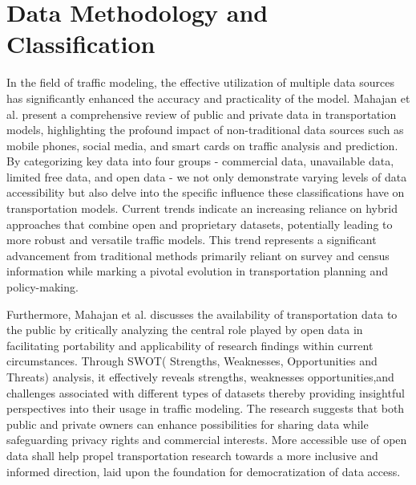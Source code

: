 \documentclass[12pt,two side]{report}
\begin{document}
\section {Data Methodology and Classification}
In the field of traffic modeling, the effective utilization of multiple data sources has significantly enhanced the accuracy and practicality of the model. Mahajan et al. present a comprehensive review of public and private data in transportation models, highlighting the profound impact of non-traditional data sources such as mobile phones, social media, and smart cards on traffic analysis and prediction\cite{mahajan2022data}. By categorizing key data into four groups - commercial data, unavailable data, limited free data, and open data - we not only demonstrate varying levels of data accessibility but also delve into the specific influence these classifications have on transportation models\cite{mahajan2022data}. Current trends indicate an increasing reliance on hybrid approaches that combine open and proprietary datasets, potentially leading to more robust and versatile traffic models. This trend represents a significant advancement from traditional methods primarily reliant on survey and census information while marking a pivotal evolution in transportation planning and policy-making.\newline

Furthermore, Mahajan et al. discusses the availability of transportation data to the public by critically analyzing the central role played by open data in facilitating portability and applicability of research findings within current circumstances. Through SWOT( Strengths, Weaknesses,
Opportunities and Threats) analysis\cite{mahajan2022data}, it effectively reveals strengths, weaknesses opportunities,and challenges associated with different types of datasets thereby providing insightful perspectives into their usage in traffic modeling. The research suggests that both public and private owners can enhance possibilities for sharing data while safeguarding privacy rights and commercial interests\cite{mahajan2022data}. More accessible use of open data shall help propel transportation research towards a more inclusive and informed direction, laid upon the foundation for democratization of data access.
\end{document}
